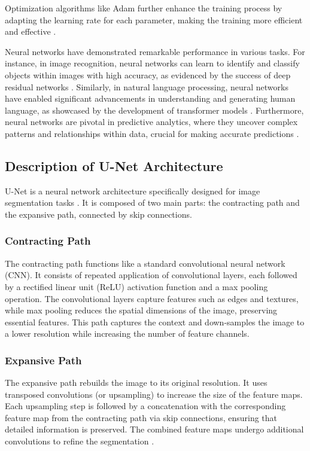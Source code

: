 \documentclass[preprint,12pt]{elsarticle}
\begin{document}
Optimization algorithms like Adam further enhance the training process by adapting the learning rate for each parameter, making the training more efficient and effective \cite{kingma2014adam}.

Neural networks have demonstrated remarkable performance in various tasks. For instance, in image recognition, neural networks can learn to identify and classify objects within images with high accuracy, as evidenced by the success of deep residual networks \cite{he2016deep}. Similarly, in natural language processing, neural networks have enabled significant advancements in understanding and generating human language, as showcased by the development of transformer models \cite{vaswani2017attention}. Furthermore, neural networks are pivotal in predictive analytics, where they uncover complex patterns and relationships within data, crucial for making accurate predictions \cite{schmidhuber2015deep}.

\subsection{Description of U-Net Architecture}

U-Net is a neural network architecture specifically designed for image segmentation tasks \cite{ronneberger2015u}. It is composed of two main parts: the contracting path and the expansive path, connected by skip connections.

\subsubsection{Contracting Path}

The contracting path functions like a standard convolutional neural network (CNN). It consists of repeated application of convolutional layers, each followed by a rectified linear unit (ReLU) activation function and a max pooling operation. The convolutional layers capture features such as edges and textures, while max pooling reduces the spatial dimensions of the image, preserving essential features. This path captures the context and down-samples the image to a lower resolution while increasing the number of feature channels.

\subsubsection{Expansive Path}

The expansive path rebuilds the image to its original resolution. It uses transposed convolutions (or upsampling) to increase the size of the feature maps. Each upsampling step is followed by a concatenation with the corresponding feature map from the contracting path via skip connections, ensuring that detailed information is preserved. The combined feature maps undergo additional convolutions to refine the segmentation \cite{ronneberger2015u}.
\end{document}
